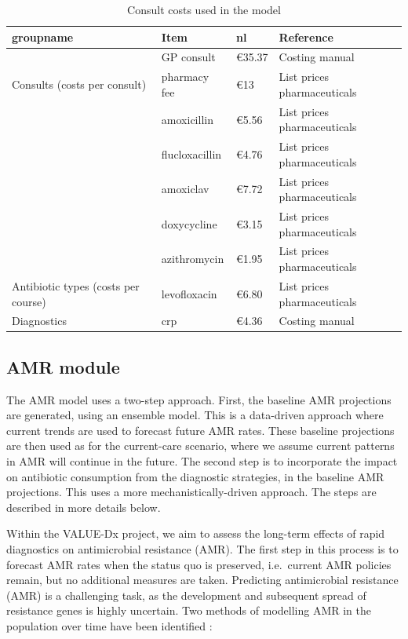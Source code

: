 \documentclass[
]{article}
\begin{document}
\begin{table}

\caption{\label{tab:gp-costs}Consult costs used in the model}
\centering
\begin{tabular}[t]{llll}
\toprule
groupname & Item & nl & Reference\\
\midrule
 & GP consult & €35.37 & Costing manual\\
\cmidrule{2-4}
\multirow{-2}{*}{\raggedright\arraybackslash Consults (costs per consult)} & pharmacy fee & €13 & List prices pharmaceuticals\\
\cmidrule{1-4}
 & amoxicillin & €5.56 & List prices pharmaceuticals\\
\cmidrule{2-4}
 & flucloxacillin & €4.76 & List prices pharmaceuticals\\
\cmidrule{2-4}
 & amoxiclav & €7.72 & List prices pharmaceuticals\\
\cmidrule{2-4}
 & doxycycline & €3.15 & List prices pharmaceuticals\\
\cmidrule{2-4}
 & azithromycin & €1.95 & List prices pharmaceuticals\\
\cmidrule{2-4}
\multirow{-6}{*}{\raggedright\arraybackslash Antibiotic types (costs per course)} & levofloxacin & €6.80 & List prices pharmaceuticals\\
\cmidrule{1-4}
Diagnostics & crp & €4.36 & Costing manual\\
\bottomrule
\end{tabular}
\end{table}

\hypertarget{amr-module}{%
\subsection{AMR module}\label{amr-module}}

The AMR model uses a two-step approach. First, the baseline AMR projections are generated, using an ensemble model. This is a data-driven approach where current trends are used to forecast future AMR rates. These baseline projections are then used as for the current-care scenario, where we assume current patterns in AMR will continue in the future. The second step is to incorporate the impact on antibiotic consumption from the diagnostic strategies, in the baseline AMR projections. This uses a more mechanistically-driven approach. The steps are described in more details below.

Within the VALUE-Dx project, we aim to assess the long-term effects of rapid diagnostics on antimicrobial resistance (AMR). The first step in this process is to forecast AMR rates when the status quo is preserved, i.e.~current AMR policies remain, but no additional measures are taken. Predicting antimicrobial resistance (AMR) is a challenging task, as the development and subsequent spread of resistance genes is highly uncertain. Two methods of modelling AMR in the population over time have been identified \autocite{rotheryFrameworkValueAssessment2018}:
\end{document}
